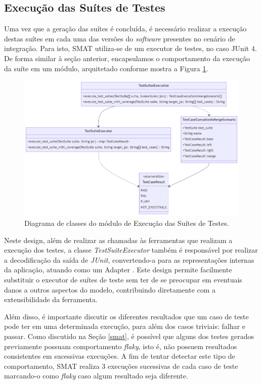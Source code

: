 \documentclass[12pt]{article}
\begin{document}
\subsection{Execução das Suítes de Testes}
Uma vez que a geração das suítes é concluída, é necessário realizar a execução destas suítes em cada uma das versões do \textit{software} presentes no cenário de integração. Para isto, SMAT utiliza-se de um executor de testes, no caso JUnit 4. De forma similar à seção anterior, encapsulamos o comportamento da execução da suíte em um módulo, arquitetado conforme mostra a Figura \ref{fig:tse}.

\begin{figure}
    \centering
    \includegraphics[width=\textwidth]{imagens/tse.png}
    \caption{Diagrama de classes do módulo de Execução das Suítes de Testes.}
    \label{fig:tse}
\end{figure}

Neste design, além de realizar as chamadas às ferramentas que realizam a execução dos testes, a classe \textit{TestSuiteExecutor} também é responsável por realizar a decodificação da saída de \textit{JUnit}, convertendo-a para as representações internas da aplicação, atuando como um Adapter \cite{gof}. Este design permite facilmente substituir o executor de suítes de teste sem ter de se preocupar em eventuais danos a outros aspectos do modelo, contribuindo diretamente com a extensibilidade da ferramenta.
	
Além disso, é importante discutir os diferentes resultados que um caso de teste pode ter em uma determinada execução, para além dos casos triviais: falhar e passar. Como discutido na Seção \ref{smat}, é possível que alguns dos testes gerados previamente possuam comportamento \textit{flaky}, isto é, não possuem resultados consistentes em sucessivas execuções. A fim de tentar detectar este tipo de comportamento, SMAT realiza 3 execuções sucessivas de cada caso de teste marcando-o como \textit{flaky} caso algum resultado seja diferente.
\end{document}
